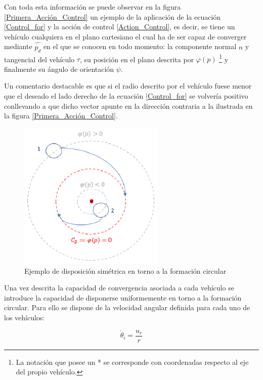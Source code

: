 Con toda esta información se puede observar en la figura \ref{Primera_Acción_Control} un ejemplo de la aplicación de la ecuación \ref{Control_for} y la acción de control \ref{Action_Control}, es decir, se tiene un vehículo cualquiera en el plano cartesiano el cual ha de ser capaz de converger mediante $\hat{\dot{p_{d}}}$ en el que se conocen en todo momento: la componente normal $n$ y tangencial del vehículo $\tau$, su posición en el plano descrita por $\varphi\left(p\right)$ \footnote[6]{La notación que posee un * se corresponde con coordenadas respecto al eje del propio vehículo.} y finalmente su ángulo de orientación $\psi$. 

Un comentario destacable es que si el radio  descrito por el vehículo fuese menor que el deseado el lado derecho de la ecuación \ref{Control_for} se volvería positivo conllevando a que dicho vector apunte en la dirección contraria a la ilustrada en la figura \ref{Primera_Acción_Control}.\\

\begin{figure}[htb]
\centering
\includegraphics[width=0.62\textwidth]{figures/Pruea_Coordinacion.eps}
\caption{Ejemplo de disposición simétrica en torno a la formación circular} \label{Ejemplo_Coordinacion}
\end{figure}
\newpage
Una vez descrita la capacidad de convergencia asociada a cada vehículo se introduce la capacidad de disponerse uniformemente en torno a la formación circular. Para ello se dispone de la velocidad angular definida para cada uno de los vehículos:

\begin{equation}
	\dot{\theta}_{i}=\frac{u_{r}}{r}
\end{equation}

